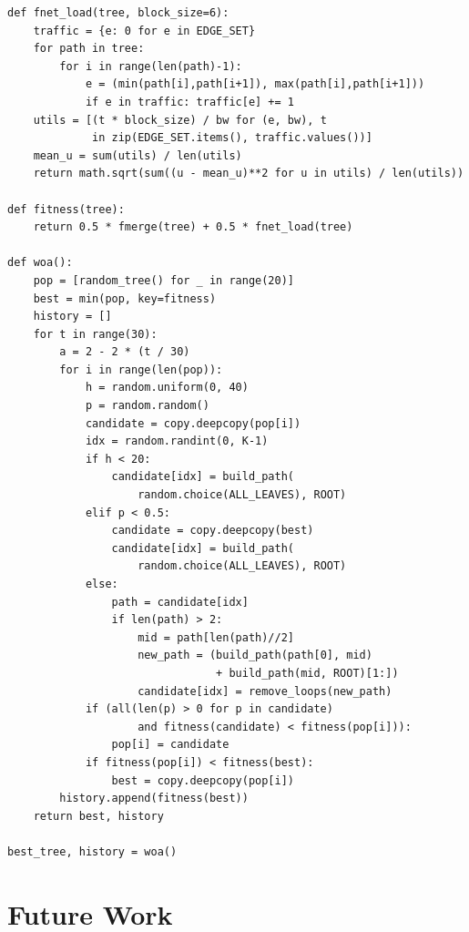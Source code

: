 \documentclass[sigconf]{acmart}
\begin{document}
\begin{lstlisting}
def fnet_load(tree, block_size=6):
    traffic = {e: 0 for e in EDGE_SET}
    for path in tree:
        for i in range(len(path)-1):
            e = (min(path[i],path[i+1]), max(path[i],path[i+1]))
            if e in traffic: traffic[e] += 1
    utils = [(t * block_size) / bw for (e, bw), t
             in zip(EDGE_SET.items(), traffic.values())]
    mean_u = sum(utils) / len(utils)
    return math.sqrt(sum((u - mean_u)**2 for u in utils) / len(utils))

def fitness(tree):
    return 0.5 * fmerge(tree) + 0.5 * fnet_load(tree)

def woa():
    pop = [random_tree() for _ in range(20)]
    best = min(pop, key=fitness)
    history = []
    for t in range(30):
        a = 2 - 2 * (t / 30)
        for i in range(len(pop)):
            h = random.uniform(0, 40)
            p = random.random()
            candidate = copy.deepcopy(pop[i])
            idx = random.randint(0, K-1)
            if h < 20:
                candidate[idx] = build_path(
                    random.choice(ALL_LEAVES), ROOT)
            elif p < 0.5:
                candidate = copy.deepcopy(best)
                candidate[idx] = build_path(
                    random.choice(ALL_LEAVES), ROOT)
            else:
                path = candidate[idx]
                if len(path) > 2:
                    mid = path[len(path)//2]
                    new_path = (build_path(path[0], mid)
                                + build_path(mid, ROOT)[1:])
                    candidate[idx] = remove_loops(new_path)
            if (all(len(p) > 0 for p in candidate)
                    and fitness(candidate) < fitness(pop[i])):
                pop[i] = candidate
            if fitness(pop[i]) < fitness(best):
                best = copy.deepcopy(pop[i])
        history.append(fitness(best))
    return best, history

best_tree, history = woa()
\end{lstlisting}


\section{Future Work}
\end{document}
